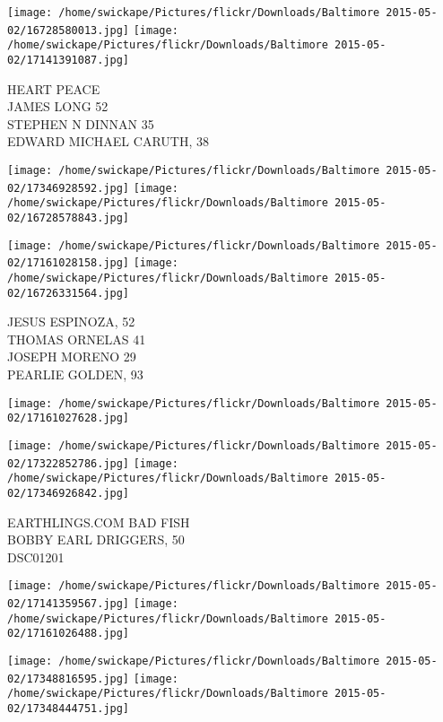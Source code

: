 \documentclass[10pt,letterpaper]{article}
\begin{document}
\texttt{[image: /home/swickape/Pictures/flickr/Downloads/Baltimore 2015-05-02/16728580013.jpg]}
\texttt{[image: /home/swickape/Pictures/flickr/Downloads/Baltimore 2015-05-02/17141391087.jpg]}

HEART PEACE\\
JAMES LONG 52\\
STEPHEN N DINNAN 35\\
EDWARD MICHAEL CARUTH, 38\\
\pagebreak

\texttt{[image: /home/swickape/Pictures/flickr/Downloads/Baltimore 2015-05-02/17346928592.jpg]}
\texttt{[image: /home/swickape/Pictures/flickr/Downloads/Baltimore 2015-05-02/16728578843.jpg]}

\texttt{[image: /home/swickape/Pictures/flickr/Downloads/Baltimore 2015-05-02/17161028158.jpg]}
\texttt{[image: /home/swickape/Pictures/flickr/Downloads/Baltimore 2015-05-02/16726331564.jpg]}

JESUS ESPINOZA, 52\\
THOMAS ORNELAS 41\\
JOSEPH MORENO 29\\
PEARLIE GOLDEN, 93\\
\pagebreak

\texttt{[image: /home/swickape/Pictures/flickr/Downloads/Baltimore 2015-05-02/17161027628.jpg]}

\vspace{0.25in}
\texttt{[image: /home/swickape/Pictures/flickr/Downloads/Baltimore 2015-05-02/17322852786.jpg]}
\texttt{[image: /home/swickape/Pictures/flickr/Downloads/Baltimore 2015-05-02/17346926842.jpg]}

EARTHLINGS.COM BAD FISH\\
BOBBY EARL DRIGGERS, 50\\
DSC01201\\
\pagebreak

\texttt{[image: /home/swickape/Pictures/flickr/Downloads/Baltimore 2015-05-02/17141359567.jpg]}
\texttt{[image: /home/swickape/Pictures/flickr/Downloads/Baltimore 2015-05-02/17161026488.jpg]}

\texttt{[image: /home/swickape/Pictures/flickr/Downloads/Baltimore 2015-05-02/17348816595.jpg]}
\texttt{[image: /home/swickape/Pictures/flickr/Downloads/Baltimore 2015-05-02/17348444751.jpg]}
\end{document}
